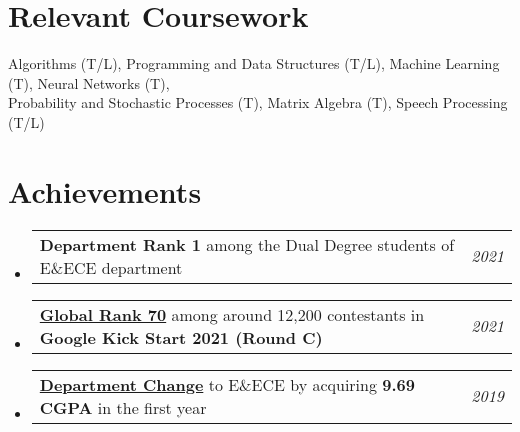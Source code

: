 \documentclass[a4,10pt]{article}
\makeatletter
\newcommand{\chrono}[2]{
\item
\begin{tabular*}{0.97\textwidth}{l@{\extracolsep{\fill}}r}
#1 & \textit{#2}
\end{tabular*}
}
\makeatother
\begin{document}
\section{Relevant Coursework}
{Algorithms (T/L), Programming and Data Structures (T/L), Machine Learning (T), Neural Networks (T), \\Probability and Stochastic Processes (T), Matrix Algebra (T), Speech Processing (T/L)}

\section{Achievements}
  \begin{itemize}[leftmargin=*]
  \itemsep-0.15em
      \chrono{\textbf{Department Rank 1} among the Dual Degree students of E\&ECE department}{2021}
      \chrono{\href{https://utkarsh512.github.io/docs/coding_competitions/kickstart/2021.pdf}{\textbf{Global Rank 70}} among around 12,200 contestants in \textbf{Google Kick Start 2021 (Round C)}}{2021}
      \chrono{\href{https://utkarsh512.github.io/docs/acads/branch_change.pdf}{\textbf{Department Change}} to E\&ECE by acquiring \textbf{9.69 CGPA} in the first year}{2019}
  \end{itemize}
\end{document}
